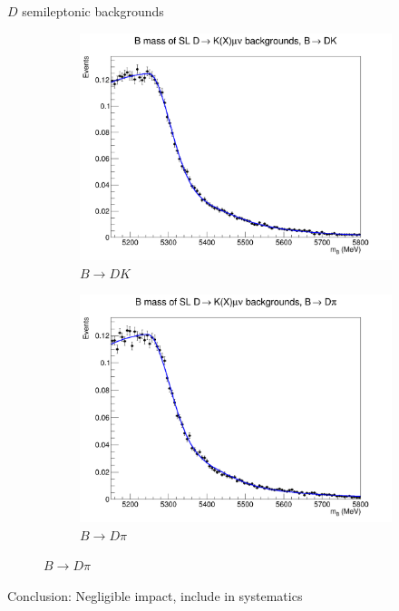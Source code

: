 \documentclass{beamer}
\begin{document}
\begin{frame}{$D$ semileptonic backgrounds}
  \begin{figure}
    \centering
    \vspace{-0.2cm}
    \begin{subfigure}{0.5\textwidth}
      \includegraphics[width = 1.0\textwidth]{Plots/D_SL_RapidSim_Combined_Fit_B2DK.png}
      \caption{$B\to DK$}
    \end{subfigure}%
    \begin{subfigure}{0.5\textwidth}
      \includegraphics[width = 1.0\textwidth]{Plots/D_SL_RapidSim_Combined_Fit_B2Dpi.png}
      \caption{$B\to D\pi$}
    \end{subfigure}
  \end{figure}
  \begin{center}
    Conclusion: Negligible impact, include in systematics
  \end{center}
\end{frame}
\end{document}
